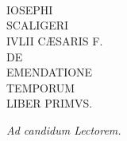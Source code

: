 

\chapter*{}
\begin{center}
\begin{textsc}
\\
\Large IOSEPHI\\
\Huge SCALIGERI\\
\Large IVLII CÆSARIS F.\\
\large DE\\
\Huge EMENDATIONE\\
\Large TEMPORUM\\
\large LIBER PRIMVS.\\
\end{textsc}
\em{Ad candidum Lectorem.}
\end{center}
\normalsize

